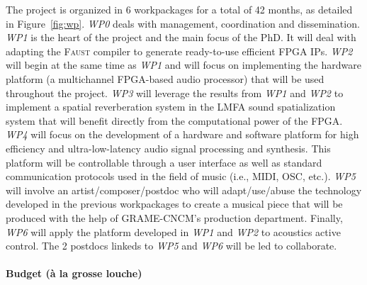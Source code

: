 \documentclass[a4paper,10pt]{article}
\newcommand{\F}{\textsc{Faust}}
\begin{document}
The project is organized in 6 workpackages for a total of 42 months, as detailed in Figure~\ref{fig:wp}. \textit{WP0} deals with management, coordination and dissemination. \textit{WP1} is the heart of the project and the main focus of the PhD. It will deal with adapting the \F{} compiler to generate ready-to-use efficient FPGA IPs. \textit{WP2} will begin at the same time as \textit{WP1} and will focus on implementing the hardware platform (a multichannel FPGA-based audio processor) that will be used throughout the project. \textit{WP3} will leverage the results from \textit{WP1} and \textit{WP2} to implement a spatial reverberation system in the LMFA sound spatialization system that will benefit directly from the computational power of the FPGA. %
\textit{WP4} will focus on the development of a hardware and software platform for high efficiency and ultra-low-latency audio signal processing and synthesis. This platform will be controllable through a user interface as well as standard communication protocols used in the field of music (i.e., MIDI, OSC, etc.).
\textit{WP5} will involve an artist/composer/postdoc who will adapt/use/abuse the technology developed in the previous workpackages to create a musical piece that will be produced with the help of GRAME-CNCM's production department. %
Finally, \textit{WP6} will apply the platform developed in \textit{WP1} and \textit{WP2} to acoustics active control. The 2 postdocs linkeds to \textit{WP5} and \textit{WP6} will be led to collaborate. 

\paragraph{Budget (à la grosse louche)}



\end{document}
